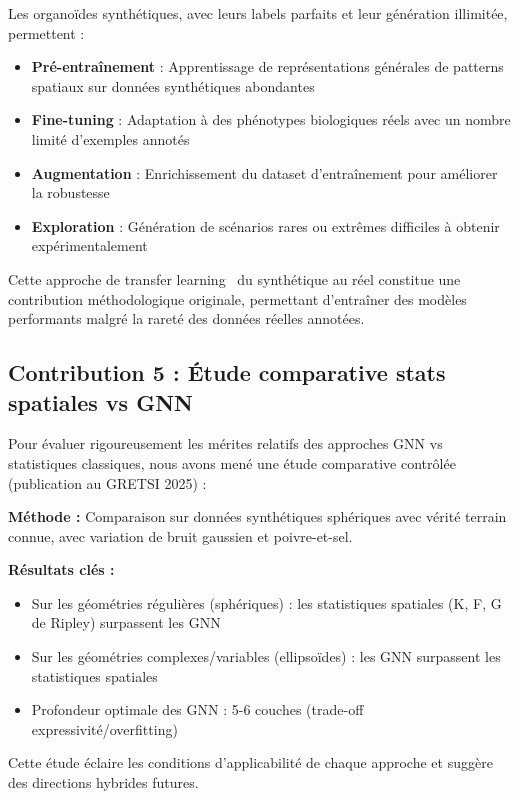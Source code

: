 Les organoïdes synthétiques, avec leurs labels parfaits et leur génération illimitée, permettent :
\begin{itemize}
    \item \textbf{Pré-entraînement} : Apprentissage de représentations générales de patterns spatiaux sur données synthétiques abondantes
    \item \textbf{Fine-tuning} : Adaptation à des phénotypes biologiques réels avec un nombre limité d'exemples annotés
    \item \textbf{Augmentation} : Enrichissement du dataset d'entraînement pour améliorer la robustesse
    \item \textbf{Exploration} : Génération de scénarios rares ou extrêmes difficiles à obtenir expérimentalement
\end{itemize}

Cette approche de transfer learning~\cite{Pan2010,Weiss2016} du synthétique au réel constitue une contribution méthodologique originale, permettant d'entraîner des modèles performants malgré la rareté des données réelles annotées.

\subsection{Contribution 5 : Étude comparative stats spatiales vs GNN}

Pour évaluer rigoureusement les mérites relatifs des approches GNN vs statistiques classiques, nous avons mené une étude comparative contrôlée (publication au GRETSI 2025) :

\textbf{Méthode :}
Comparaison sur données synthétiques sphériques avec vérité terrain connue, avec variation de bruit gaussien et poivre-et-sel.

\textbf{Résultats clés :}
\begin{itemize}
    \item Sur les géométries régulières (sphériques) : les statistiques spatiales (K, F, G de Ripley) surpassent les GNN
    \item Sur les géométries complexes/variables (ellipsoïdes) : les GNN surpassent les statistiques spatiales
    \item Profondeur optimale des GNN : 5-6 couches (trade-off expressivité/overfitting)
\end{itemize}

Cette étude éclaire les conditions d'applicabilité de chaque approche et suggère des directions hybrides futures.

